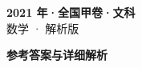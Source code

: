 \documentclass[zihao=-4, a4paper]{ctexart}
\begin{document}
\begin{center}
  {\Large\bfseries 2021 年·全国甲卷·文科}\\[4pt]
  {\large 数学 · 解析版}
\end{center}
\medskip
{}

\clearpage
{}
\begin{center}{\Large\bfseries 参考答案与详细解析}\end{center}
\medskip

\end{document}
